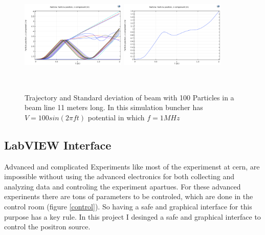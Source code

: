 \documentclass{article}
\begin{document}
\begin{figure}[h]
\centering
\includegraphics[width=50mm, height=50mm]{buncer-in-100V-1Mhz-50Particles}
\includegraphics[width=50mm, height=50mm]{buncer-std-100V-1Mhz-50Particles}
\caption{Trajectory and Standard deviation of beam with 100 Particles in a beam line 11 meters long. In this simulation buncher has $ V = 100 sin(2 \pi f t) $ potential in which $ f=1 MHz $}
\end{figure}



\newpage


\subsection{LabVIEW Interface}

Advanced and complicated Experiments like most of the experimenst at cern, are impossible without using the advanced electronics for both collecting and analyzing data and controling the experiment apartues. For these advanced experinents there are tons of parameters to be controled, which are done in the control room (figure \ref{control}). 
So having a safe and graphical interface for this purpose has a key rule. In this project I desinged a safe and graphical interface to control the positron source. 
\end{document}
